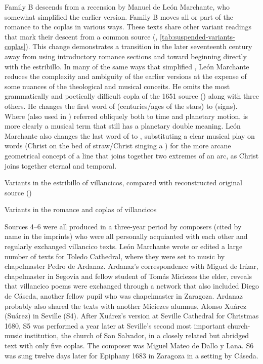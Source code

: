 Family B descends from a recension by Manuel de León Marchante, who somewhat
simplified the earlier version.%
    \Autocite[\XXX]{LeonMarchante:Obras1733}
Family B moves all or part of the romance to the coplas in various ways.
These texts share other variant readings that mark their descent from a common
source (, 
\ref{tab:suspended-variants-coplas}).
This change demonstrates a transition in the later seventeenth century away from
using introductory romance sections and toward beginning directly with
the estribillo.%
    \Autocite{Torrente:Estribillo}
In many of the same ways that  simplified
, León Marchante reduces the complexity and
ambiguity of the earlier versions at the expense of some nuances of the
theological and musical conceits.
He omits the most grammatically and poetically difficult copla of the 1651
source () along with three others.
He changes the first word of  (centuries/ages of
the stars) to  (signs). 
Where  (also used in ) referred obliquely both to
time and planetary motion,  is more clearly a musical term that
still has a planetary double meaning.
León Marchante also changes the last word of 
to , substituting a clear musical play on words (Christ
 on the bed of straw/Christ singing a ) for the
more arcane geometrical concept of a line that joins together two extremes of
an arc, as Christ joins together eternal and temporal.

{Variants in the estribillo of  villancicos,
compared with reconstructed original source ()}

{Variants in the romance and coplas of  villancicos}

Sources 4--6 were all produced in a three-year period by composers (cited by
name in the imprints) who were all personally acquianted with each other and
regularly exchanged villancico texts.
León Marchante wrote or edited a large number of texts for Toledo Cathedral,
where they were set to music by chapelmaster Pedro de Ardanaz.
Ardanaz's correspondence with Miguel de Irízar, chapelmaster in Segovia and
fellow student of Tomás Miciezes the elder, reveals that villancico poems were
exchanged through a network that also included Diego de Cáseda, another fellow
pupil who was chapelmaster in Zaragoza.%
    \autocite[302--311]{Cashner:PhD}
Ardanaz probably also shared the texts with another Miciezes alumnus, Alonso
Xuárez (Suárez) in Seville (S4).
After Xuárez's version at Seville Cathedral for Christmas 1680, S5 was performed
a year later at Seville's second most important church-music institution, the
church of San Salvador, in a closely related but abridged text with only five
coplas.
The composer was Miguel Mateo de Dallo y Lana.
S6 was sung twelve days later for Epiphany 1683 in Zaragoza in a setting by
Cáseda.

